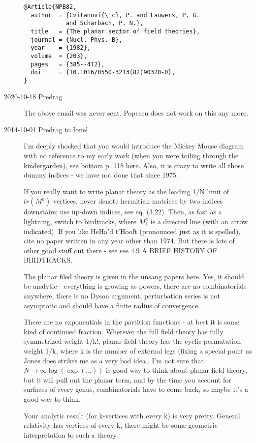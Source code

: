 \begin{description}
\begin{verbatim}
@Article{NPB82,
  author  = {Cvitanovi{\'c}, P. and Lauwers, P. G.
            and Scharbach, P. N.},
  title   = {The planar sector of field theories},
  journal = {Nucl. Phys. B},
  year    = {1982},
  volume  = {203},
  pages   = {385--412},
  doi     = {10.1016/0550-3213(82)90320-0},
}
\end{verbatim}

\item[2020-10-18 Predrag]
The above email was never sent. Popescu does not work on this any more.

\item[2014-10-01 Predrag to Ionel]
I'm deeply shocked that you would introduce the Mickey Mouse diagram with
no reference to my early work (when you were toiling through the
kindergarden), see bottom p. 118
{here}. Also, it is crazy to write all
those dummy indices - we have not done that  since 1975.

If you really want to write planar theory as the leading 1/N limit of
$tr(M^k)$ vertices, never denote hermitian matrices by two indices
downstairs; use up-down indices, see eq. (3.22). Then, as fast as a
lightning, switch to birdtracks, where $M^a_b$ is a directed line (with
an arrow indicated). If you like HeHa'd t'Hooft (pronounced just as it is
spelled), cite no paper written in any year other than 1974. But there is
lots of other good stuff out there - see see 4.9 A BRIEF HISTORY OF
BIRDTRACKS.

The planar filed theory is given in the unsang papers here. Yes, it
should be analytic - everything is growing as powers, there are no
combinatorials anywhere, there is no Dyson argument, perturbation series
is not asymptotic and should have a finite radius of convergence.

There are no exponentials in the partition functions - at best it is some
kind of continued fraction. Wherever the full field theory has fully
symmetrized weight 1/k!, planar field theory has the cyclic permutation
weight 1/k, where k is the number of external legs (fixing a special
point as Jones does strikes me as a very bad idea.. I'm not sure that
$N\to\infty \log (\exp(...))$ is good way to think about planar field theory, but
it will pull out the planar term, and by the time you account for
surfaces of every genus, combinatorials have to come back, so maybe it's
a good way to think.

Your analytic result (for k-vertices with every k) is very pretty.
General relativity has vertices of every k, there might be some geometric
interpretation to such a theory.


\end{description}
